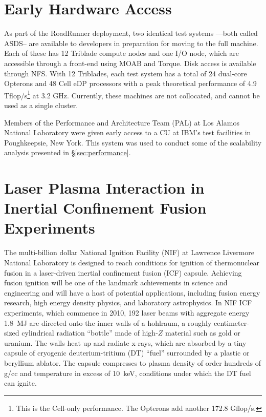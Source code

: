 \documentclass[letter,10pt]{article}
\begin{document}
\section*{Early Hardware Access}

As part of the RoadRunner deployment, two identical test systems
---both called ASDS-- are available to developers in preparation
for moving to the full machine.  Each of these has 12 Triblade
compute nodes and one I/O node, which are accessible through a
front-end using MOAB and Torque.  Disk access is available
through NFS.  With 12 Triblades, each test system has a total of
24 dual-core Opterons and 48 Cell eDP processors with a peak
theoretical performance of 4.9 Tflop/s\footnote{This is the
Cell-only performance.  The Opterons add another 172.8 Gflop/s.}
at 3.2 GHz.  Currently, these machines are not collocated,
and cannot be used as a single cluster.

Members of the Performance and Architecture Team (PAL) at
Los Alamos National Laboratory were given early access to a
CU at IBM's test facilities in Poughkeepsie, New York.  This system
was used to conduct some of the scalability analysis presented
in \S \ref{sec:performance}.

\section*{Laser Plasma Interaction in Inertial Confinement Fusion Experiments}

The multi-billion dollar National Ignition Facility (NIF) at 
Lawrence Livermore National Laboratory
is designed to reach conditions for ignition of thermonuclear fusion in a 
laser-driven inertial confinement fusion (ICF) capsule.  Achieving fusion ignition 
will be one of the landmark achievements in science and engineering and will
have a host of potential applications, including fusion energy research, 
high energy density physics, and laboratory astrophysics.  
In NIF ICF experiments, which commence in 2010, 192 laser beams with aggregate 
energy 1.8~MJ are directed onto the inner walls of a hohlraum, 
a roughly centimeter-sized cylindrical radiation ``bottle'' made of high-$Z$ material 
such as gold or uranium.  The walls heat up and radiate x-rays, which are absorbed 
by a tiny capsule
of cryogenic deuterium-tritium (DT) ``fuel'' surrounded by a plastic or beryllium 
ablator.  The capsule compresses to plasma density of order hundreds of g/cc and 
temperature in excess of 10~keV, conditions under which the DT fuel can ignite. 
\end{document}
